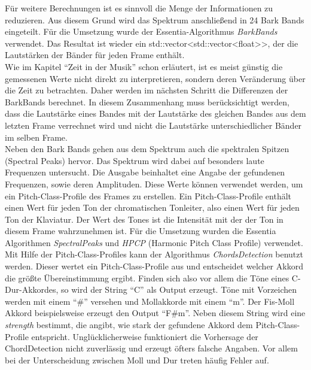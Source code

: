 \documentclass[11pt,a4paper]{article}
\begin{document}
Für weitere Berechnungen ist es sinnvoll die Menge der Informationen zu reduzieren. Aus diesem Grund wird das Spektrum anschließend in 24 Bark Bands eingeteilt. Für die Umsetzung wurde der Essentia-Algorithmus \textit{BarkBands} verwendet. Das Resultat ist wieder ein std::vector<std::vector<float>\text{}>, der die Lautstärken der Bänder für jeden Frame enthält.\\
Wie im Kapitel ``Zeit in der Musik'' schon erläutert, ist es meist günstig die gemessenen Werte nicht direkt zu interpretieren, sondern deren Veränderung über die Zeit zu betrachten. Daher werden im nächsten Schritt die Differenzen der BarkBands berechnet. In diesem Zusammenhang muss berücksichtigt werden, dass die Lautstärke eines Bandes mit der Lautstärke des gleichen Bandes aus dem letzten Frame verrechnet wird und nicht die Lautstärke unterschiedlicher Bänder im selben Frame.\\
Neben den Bark Bands gehen aus dem Spektrum auch die spektralen Spitzen (Spectral Peaks) hervor. Das Spektrum wird dabei auf besonders laute Frequenzen untersucht. Die Ausgabe beinhaltet eine Angabe der gefundenen Frequenzen, sowie deren Amplituden. Diese Werte können verwendet werden, um ein Pitch-Class-Profile des Frames zu erstellen. Ein Pitch-Class-Profile enthält einen Wert für jeden Ton der chromatischen Tonleiter, also einen Wert für jeden Ton der Klaviatur. Der Wert des Tones ist die Intensität mit der der Ton in diesem Frame wahrzunehmen ist. Für die Umsetzung wurden die Essentia Algorithmen \textit{SpectralPeaks} und \textit{HPCP} (Harmonic Pitch Class Profile) verwendet.\\
Mit Hilfe der Pitch-Class-Profiles kann der Algorithmus \textit{ChordsDetection} benutzt werden. Dieser wertet ein Pitch-Class-Profile aus und entscheidet welcher Akkord die größte Übereinstimmung ergibt. Finden sich also vor allem die Töne eines C-Dur-Akkordes, so wird der String ``C'' als Output erzeugt. Töne mit Vorzeichen werden mit einem ``\#'' versehen und Mollakkorde mit einem ``m''. Der Fis-Moll Akkord beispielsweise erzeugt den Output ``F\#m''. Neben diesem String wird eine \textit{strength} bestimmt, die angibt, wie stark der gefundene Akkord dem Pitch-Class-Profile entspricht. Unglücklicherweise funktioniert die Vorhersage der ChordDetection nicht zuverlässig und erzeugt öfters falsche Angaben. Vor allem bei der Unterscheidung zwischen Moll und Dur treten häufig Fehler auf.
\end{document}
